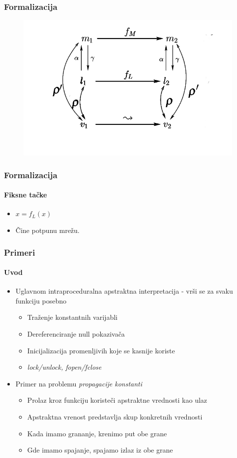 \documentclass[xetex,mathserif,serif]{beamer}
\begin{document}
  \begin{frame}
    \frametitle{Formalizacija}
    \begin{figure}
		\begin{center}
		\includegraphics[scale=0.5]{Rho_prime.png}
		\end{center}
	\end{figure}
  \end{frame}
  \begin{frame}
    \frametitle{Formalizacija}
    \framesubtitle{Fiksne tačke}
	\begin{center}
		\begin{itemize}
			\item $x = f_{L}(x)$
			\item Čine potpunu mrežu.
		\end{itemize}
		\end{center}
  \end{frame}
  \begin{frame}
    \frametitle{Primeri}
    \framesubtitle{Uvod}
    \begin{center}
		\begin{itemize}
			\item Uglavnom intraproceduralna apstraktna interpretacija - vr\v si se za svaku funkciju posebno
			\begin{itemize}
				\item Tra\v zenje konstantnih varijabli
				\item Dereferenciranje null pokaziva\v ca
				\item Inicijalizacija promenljivih koje se kasnije koriste
				\item \emph{lock/unlock, fopen/fclose}
			\end{itemize}
			\item Primer na problemu \emph{propagacije konstanti}
			\begin{itemize}
				\item Prolaz kroz funkciju koriste\v ci apstraktne vrednosti kao ulaz 
				\item Apstraktna vrenost predstavlja skup konkretnih vrednosti
				\item Kada imamo grananje, krenimo put obe grane
				\item Gde imamo spajanje, spajamo izlaz iz obe grane
			\end{itemize}
		\end{itemize}
	\end{center}
  \end{frame}
\end{document}
